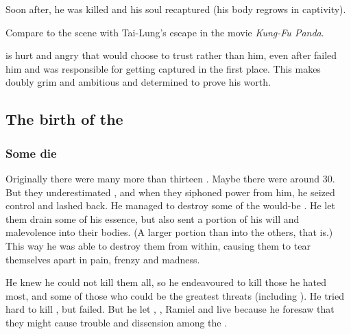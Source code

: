 Soon after, he was killed and his soul recaptured (his body regrows in captivity). 

Compare to the scene with Tai-Lung's escape in the movie \emph{Kung-Fu Panda}. 

\Secherdamon{} is hurt and angry that \Nexagglachel{} would choose to trust \Ishnaruchaefir{} rather than him, even after \Ishnaruchaefir{} failed him and was responsible for getting \Nexagglachel{} captured in the first place. 
This makes \Secherdamon{} doubly grim and ambitious and determined to prove his worth. 









\subsection{The birth of the \Satharioth}
\subsubsection{Some \satharioth{} die}
Originally there were many more than thirteen \satharioth. 
Maybe there were around 30. 
But they underestimated \Nexagglachel, and when they siphoned power from him, he seized control and lashed back.
He managed to destroy some of the would-be \satharioth.
He let them drain some of his essence, but also sent a portion of his will and malevolence into their bodies.
(A larger portion than into the others, that is.)
This way he was able to destroy them from within, causing them to tear themselves apart in pain, frenzy and madness.

He knew he could not kill them all, so he endeavoured to kill those he hated most, and some of those who could be the greatest threats (including ). 
He tried hard to kill \Morcariel, but failed. 
But he let \Azraid, \Zachirah, Ramiel and \Sithiyacaan{} live because he foresaw that they might cause trouble and dissension among the \resphain. 

